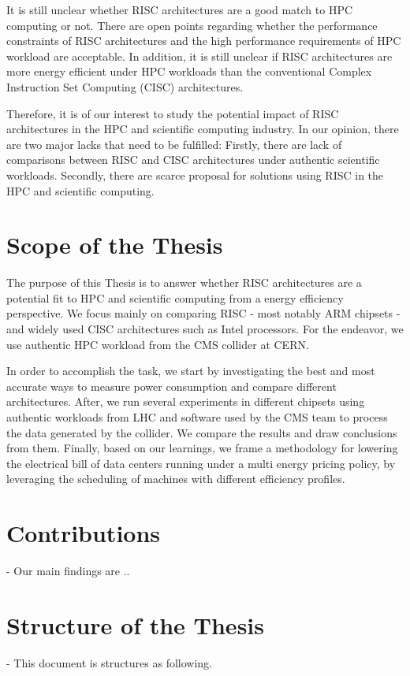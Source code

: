 It is still unclear whether RISC architectures are a good match to HPC
computing or not. There are open points regarding whether the performance 
constraints of RISC architectures and the high performance requirements of HPC 
workload are acceptable. In addition, it is still unclear if RISC architectures
are more energy efficient under HPC workloads than the conventional Complex 
Instruction Set Computing (CISC) architectures.

Therefore, it is of our interest to study the potential impact of RISC architectures in 
the HPC and scientific computing industry. In our opinion, there are two major
lacks that need to be fulfilled: Firstly, there are lack of comparisons between
RISC and CISC architectures under authentic scientific workloads. Secondly,
there are scarce proposal for solutions using RISC in the HPC and scientific
computing.
 

\section{Scope of the Thesis}
The purpose of this Thesis is to answer whether RISC architectures
are a potential fit to HPC and scientific computing from a energy efficiency
perspective. We focus mainly on comparing RISC - most notably ARM chipsets - and
widely used CISC architectures such as Intel processors. For the endeavor, we
use authentic HPC workload from the CMS collider at CERN. 

In order to accomplish the task, we start by investigating the best
and most accurate ways to measure power consumption and compare different
architectures. After, we run several experiments in different chipsets using
authentic workloads from LHC and software used by the CMS team to process the
data generated by the collider. We compare the results and
draw conclusions from them. Finally, based on our learnings, we frame a methodology for
lowering the electrical bill of data centers running under a multi energy
pricing policy, by leveraging the scheduling of machines with different
efficiency profiles.  

   
\section{Contributions}
- Our main findings are ..

\section{Structure of the Thesis}
- This document is structures as following. 
